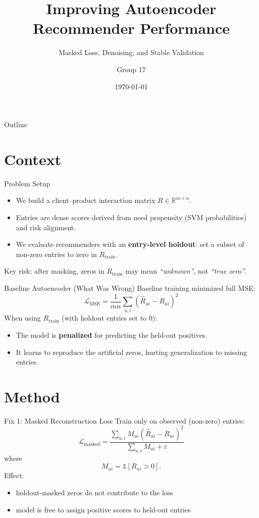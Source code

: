 \documentclass[aspectratio=169]{beamer}
\title{Improving Autoencoder Recommender Performance}
\subtitle{Masked Loss, Denoising, and Stable Validation}
\author{Group 17}
\date{\today}
\begin{document}
\begin{frame}
	\titlepage
\end{frame}

\begin{frame}{Outline}
	\tableofcontents
\end{frame}

\section{Context}

\begin{frame}{Problem Setup}
	\begin{itemize}
		\item We build a client--product interaction matrix $R \in \mathbb{R}^{m\times n}$.
		\item Entries are dense scores derived from need propensity (SVM probabilities) and risk alignment.
		\item We evaluate recommenders with an \textbf{entry-level holdout}: set a subset of non-zero entries to zero in $R_{\text{train}}$.
	\end{itemize}
	\vspace{0.5em}
	Key risk: after masking, zeros in $R_{\text{train}}$ may mean \emph{``unknown''}, not \emph{``true zero''}.
\end{frame}

\begin{frame}{Baseline Autoencoder (What Was Wrong)}
	Baseline training minimized full MSE:
	\[
		\mathcal{L}_{\text{MSE}} = \frac{1}{mn}\sum_{u,i} (\hat{R}_{ui} - R_{ui})^2
	\]
	\vspace{0.5em}
	When using $R_{\text{train}}$ (with holdout entries set to 0):
	\begin{itemize}
		\item The model is \textbf{penalized} for predicting the held-out positives.
		\item It learns to reproduce the artificial zeros, hurting generalization to missing entries.
	\end{itemize}
\end{frame}

\section{Method}

\begin{frame}{Fix 1: Masked Reconstruction Loss}
	Train only on observed (non-zero) entries:
	\[
		\mathcal{L}_{\text{masked}} = \frac{\sum_{u,i} M_{ui}(\hat{R}_{ui}-R_{ui})^2}{\sum_{u,i} M_{ui} + \varepsilon}
	\]
	where
	\[
		M_{ui} = \mathbb{1}[R_{ui} > 0].
	\]
	\vspace{0.5em}
	Effect:
	\begin{itemize}
		\item holdout-masked zeros do not contribute to the loss
		\item model is free to assign positive scores to held-out entries
	\end{itemize}
\end{frame}
\end{document}
